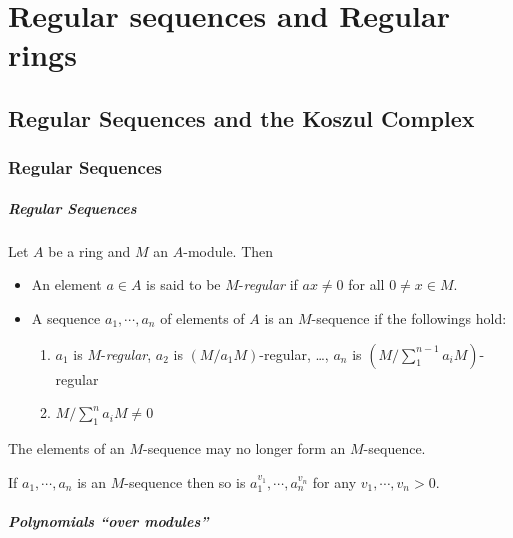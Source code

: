 \chapter{Regular sequences and Regular rings}

\section{Regular Sequences and the Koszul Complex}

\subsection{Regular Sequences}

\paragraph{Regular Sequences}

Let \( A \) be a ring and \( M \) an \( A \)-module. Then
\begin{itemize}
  \item An element \( a \in A \) is said to be \( M \)-\emph{regular} if \( ax \neq 0 \) for all \( 0 \neq x \in M \).
  \item A sequence \( a_1,\cdots, a_n \) of elements of \( A \) is an \( M \)-sequence if the followings hold:
    \begin{enumerate}
      \item \( a_1 \) is \( M \)-\emph{regular}, \( a_2 \) is \( (M / a_1 M) \)-regular, \dots, \( a_n \) is \( (M / \sum_{1}^{n - 1}a_i M) \)-regular
      \item \( M / \sum_1^na_i M \neq 0 \)
    \end{enumerate}
\end{itemize}

\begin{remark}
  The elements of an \( M \)-sequence may no longer form an \( M \)-sequence.
\end{remark}

\begin{theorem}
  If \( a_1, \cdots, a_n \) is an \( M \)-sequence then so is \( a^{v_1}_1, \cdots, a^{v_n}_n \) for any \( v_1, \cdots, v_n > 0 \).
\end{theorem}

\paragraph{Polynomials ``over modules''}

